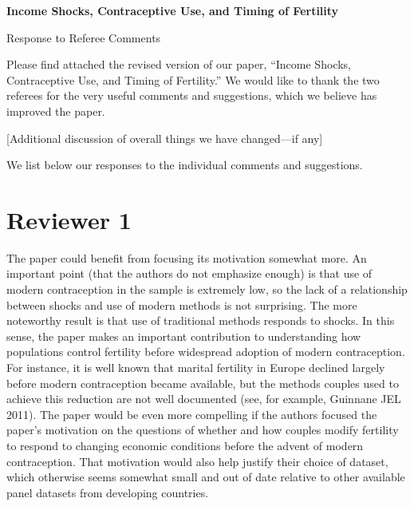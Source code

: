 \documentclass[letterpaper,12pt]{article}
\title{} \author{}
\begin{document}
\begin{center} \textbf{\large Income Shocks, Contraceptive Use, and
Timing of Fertility} \end{center}

\begin{center} Response to Referee Comments \end{center}

\noindent Please find attached the revised version of our paper,
``Income Shocks, Contraceptive Use, and Timing of Fertility.''
We would like to thank the two referees for the very useful comments and
suggestions,
which we believe has improved the paper.

[Additional discussion of overall things we have changed---if any]

We list below our responses to the individual comments and suggestions.


\newpage

\section*{Reviewer 1}


The paper could benefit from focusing its motivation somewhat more. An
important point (that the authors do not emphasize enough) is that use
of modern contraception in the sample is extremely low, so the lack of a
relationship between shocks and use of modern methods is not surprising.
The more noteworthy result is that use of traditional methods responds
to shocks. In this sense, the paper makes an important contribution to
understanding how populations control fertility before widespread
adoption of modern contraception. For instance, it is well known that
marital fertility in Europe declined largely before modern contraception
became available, but the methods couples used to achieve this reduction
are not well documented (see, for example, Guinnane JEL 2011). The paper
would be even more compelling if the authors focused the paper's
motivation on the questions of whether and how couples modify fertility
to respond to changing economic conditions before the advent of
modern contraception. That motivation would also help justify their
choice of dataset, which otherwise seems somewhat small and out of date
relative to other available panel datasets from developing countries.
\end{document}
